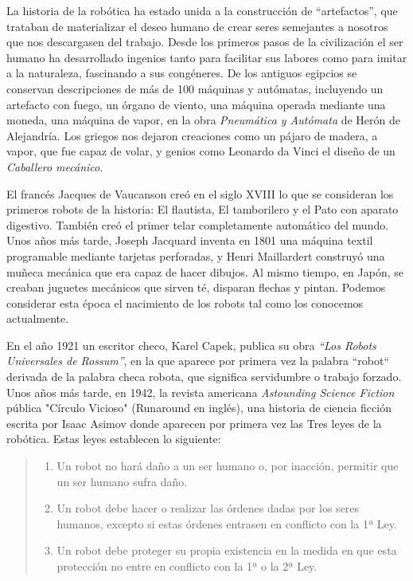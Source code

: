 La historia de la robótica ha estado unida a la construcción de “artefactos”, que trataban de materializar el deseo humano de crear seres semejantes a nosotros que nos descargasen del trabajo. Desde los primeros pasos de la civilización el ser humano ha desarrollado ingenios tanto para facilitar sus labores como para imitar a la naturaleza, fascinando a sus congéneres. De los antiguos egipcios se conservan descripciones de más de 100 máquinas y autómatas, incluyendo un artefacto con fuego, un órgano de viento, una máquina operada mediante una moneda, una máquina de vapor, en la obra \textit{Pneumática y Autómata} de Herón de Alejandría. Los griegos nos dejaron creaciones como un pájaro de madera, a vapor, que fue capaz de volar, y genios como Leonardo da Vinci el diseño de un \textit{Caballero mecánico}. 

El francés Jacques de Vaucanson creó en el siglo XVIII lo que se consideran los primeros robots de la historia: El flautista, El tamborilero y el Pato con aparato digestivo. También creó el primer telar completamente automático del mundo. Unos años más tarde, Joseph Jacquard inventa en 1801 una máquina textil programable mediante tarjetas perforadas, y Henri Maillardert construyó una muñeca mecánica que era capaz de hacer dibujos. Al mismo tiempo, en Japón, se creaban juguetes mecánicos que sirven té, disparan flechas y pintan. Podemos considerar esta época el nacimiento de los robots tal como los conocemos actualmente.

En el año 1921 un escritor checo, Karel Capek, publica su obra \textit{“Los Robots Universales de Rossum”}, en la que aparece por primera vez la palabra “robot“ derivada de la palabra checa robota, que significa servidumbre o trabajo forzado. Unos años más tarde, en 1942, la revista americana \textit{Astounding Science Fiction} pública "Círculo Vicioso" (Runaround en inglés), una historia de ciencia ficción escrita por Isaac Asimov donde aparecen por primera vez las Tres leyes de la robótica. Estas leyes establecen lo siguiente:
\begin{quote}
\begin{enumerate}[1.ª]
	\item Un robot no hará daño a un ser humano o, por inacción, permitir que un ser humano sufra daño.
	\item Un robot debe hacer o realizar las órdenes dadas por los seres humanos, excepto si estas órdenes entrasen en conflicto con la 1ª Ley.
	\item Un robot debe proteger su propia existencia en la medida en que esta protección no entre en conflicto con la 1ª o la 2ª Ley.
\end{enumerate}
\end{quote}


